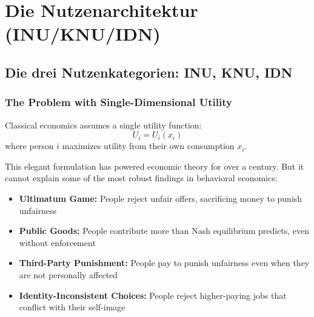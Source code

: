 \section{Die Nutzenarchitektur (INU/KNU/IDN)}
\label{sec:fepsde-utility}


\subsection{Die drei Nutzenkategorien: INU, KNU, IDN}
\label{subsec:three-categories}


\subsubsection{The Problem with Single-Dimensional Utility}

Classical economics assumes a single utility function:
\begin{equation}
U_i = U_i(x_i)
\end{equation}
where person $i$ maximizes utility from their own consumption $x_i$.

This elegant formulation has powered economic theory for over a century.
But it cannot explain some of the most robust findings in behavioral economics:

\begin{itemize}
\item \textbf{Ultimatum Game:} People reject unfair offers, sacrificing money 
to punish unfairness \citep{guth1982experimental}
\item \textbf{Public Goods:} People contribute more than Nash equilibrium predicts, 
even without enforcement \citep{fehr2000cooperation}
\item \textbf{Third-Party Punishment:} People pay to punish unfairness 
even when they are not personally affected \citep{fehr2004third}
\item \textbf{Identity-Inconsistent Choices:} People reject higher-paying jobs 
that conflict with their self-image \citep{akerlofkranton}
\end{itemize}

